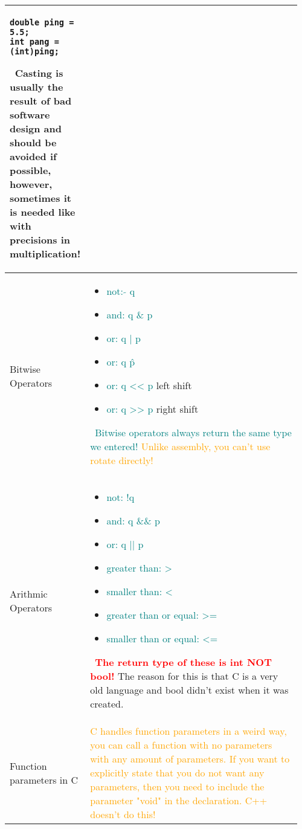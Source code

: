 \documentclass[main.tex,fontsize=8pt,paper=a4,paper=portrait,DIV=calc,]{scrartcl}
\begin{document}
\begin{table}[ht!]
\begin{tabular}{|m{0.2\linewidth}|m{0.755\linewidth}|}
\begin{lstlisting}
double ping = 5.5;
int pang = (int)ping;
\end{lstlisting}
\, \newline
\textcolor{OliveGreen}{Casting is usually the result of bad software design and should be avoided if possible,\newline
however, sometimes it is needed like with precisions in multiplication!}\\
\hline
Bitwise Operators & 
\vspace{2mm}
\begin{itemize}
  \item \textcolor{teal}{not: \(\tilde{} \) q}
  \item \textcolor{teal}{and: q \& p }
  \item \textcolor{teal}{or: q | p}
  \item \textcolor{teal}{or: q \^ p}
  \item \textcolor{teal}{or: q << p} left shift
  \item \textcolor{teal}{or: q >> p} right shift
\end{itemize}
\, \newline
\textcolor{teal}{Bitwise operators always return the same type we entered!}\newline 
\textcolor{orange}{Unlike assembly, you can't use rotate directly!} \\
\hline
Arithmic Operators& 
\vspace{2mm}
\begin{itemize}
  \item \textcolor{teal}{not: !q}
  \item \textcolor{teal}{and: q \&\& p}
  \item \textcolor{teal}{or: q || p}
  \item \textcolor{teal}{greater than: >}
  \item \textcolor{teal}{smaller than: <}
  \item \textcolor{teal}{greater than or equal: >=}
  \item \textcolor{teal}{smaller than or equal: <=}
\end{itemize}
\, \newline
\textcolor{red}{\textbf{The return type of these is int NOT bool!}}\newline
The reason for this is that C is a very old language and bool didn't exist when it was created.\\
\hline
Function parameters in C &
\textcolor{orange}{C handles function parameters in a weird way, you can call a function with no parameters with any amount of parameters. If you want to explicitly state that you do not want any parameters, then you need to include the parameter "void" in the declaration. C++ doesn't do this!}\newline

\end{tabular}
\end{table}
\end{document}
